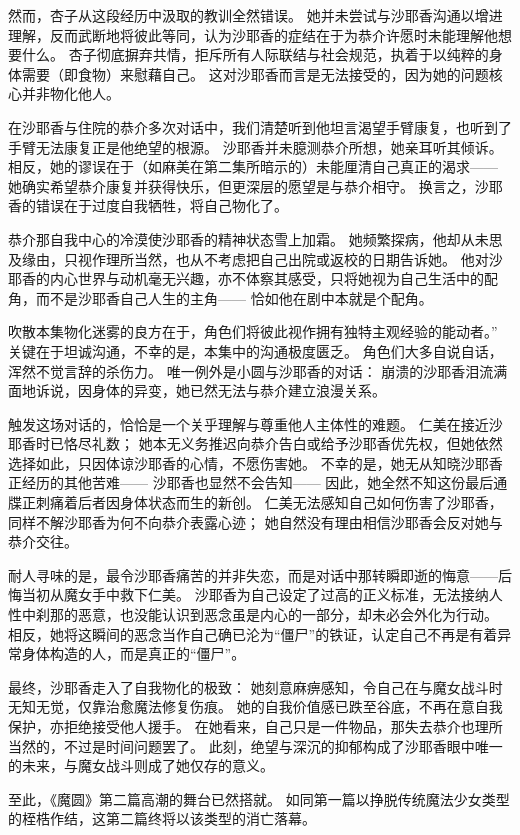 然而，杏子从这段经历中汲取的教训全然错误。
她并未尝试与沙耶香沟通以增进理解，反而武断地将彼此等同，认为沙耶香的症结在于为恭介许愿时未能理解他想要什么。
杏子彻底摒弃共情，拒斥所有人际联结与社会规范，执着于以纯粹的身体需要（即食物）来慰藉自己。
这对沙耶香而言是无法接受的，因为她的问题核心并非物化他人。

在沙耶香与住院的恭介多次对话中，我们清楚听到他坦言渴望手臂康复，也听到了手臂无法康复正是他绝望的根源。
沙耶香并未臆测恭介所想，她亲耳听其倾诉。
相反，她的谬误在于（如麻美在第二集所暗示的）未能厘清自己真正的渴求——
她确实希望恭介康复并获得快乐，但更深层的愿望是与恭介相守。
换言之，沙耶香的错误在于过度自我牺牲，将自己物化了。

恭介那自我中心的冷漠使沙耶香的精神状态雪上加霜。
她频繁探病，他却从未思及缘由，只视作理所当然，也从不考虑把自己出院或返校的日期告诉她。
他对沙耶香的内心世界与动机毫无兴趣，亦不体察其感受，只将她视为自己生活中的配角，而不是沙耶香自己人生的主角——
恰如他在剧中本就是个配角。

吹散本集物化迷雾的良方在于，角色们将彼此视作拥有独特主观经验的能动者。”
关键在于坦诚沟通，不幸的是，本集中的沟通极度匮乏。
角色们大多自说自话，浑然不觉言辞的杀伤力。
唯一例外是小圆与沙耶香的对话：
崩溃的沙耶香泪流满面地诉说，因身体的异变，她已然无法与恭介建立浪漫关系。

触发这场对话的，恰恰是一个关乎理解与尊重他人主体性的难题。
仁美在接近沙耶香时已恪尽礼数；
她本无义务推迟向恭介告白或给予沙耶香优先权，但她依然选择如此，只因体谅沙耶香的心情，不愿伤害她。
不幸的是，她无从知晓沙耶香正经历的其他苦难——
沙耶香也显然不会告知——
因此，她全然不知这份最后通牒正刺痛着后者因身体状态而生的新创。
仁美无法感知自己如何伤害了沙耶香，同样不解沙耶香为何不向恭介表露心迹；
她自然没有理由相信沙耶香会反对她与恭介交往。

耐人寻味的是，最令沙耶香痛苦的并非失恋，而是对话中那转瞬即逝的悔意——后悔当初从魔女手中救下仁美。
沙耶香为自己设定了过高的正义标准，无法接纳人性中刹那的恶意，也没能认识到恶念虽是内心的一部分，却未必会外化为行动。
相反，她将这瞬间的恶念当作自己确已沦为“僵尸”的铁证，认定自己不再是有着异常身体构造的人，而是真正的“僵尸”。

最终，沙耶香走入了自我物化的极致：
她刻意麻痹感知，令自己在与魔女战斗时无知无觉，仅靠治愈魔法修复伤痕。
她的自我价值感已跌至谷底，不再在意自我保护，亦拒绝接受他人援手。
在她看来，自己只是一件物品，那失去恭介也理所当然的，不过是时间问题罢了。
此刻，绝望与深沉的抑郁构成了沙耶香眼中唯一的未来，与魔女战斗则成了她仅存的意义。

至此，《魔圆》第二篇高潮的舞台已然搭就。
如同第一篇以挣脱传统魔法少女类型的桎梏作结，这第二篇终将以该类型的消亡落幕。
